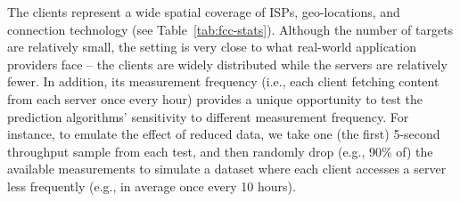 The clients
represent a wide spatial coverage of ISPs, geo-locations, and connection technology (see Table~\ref{tab:fcc-stats}). Although the number of targets are relatively small, the setting is very close to what real-world application providers face -- the clients are widely distributed while the servers are relatively fewer. 
In addition, its measurement frequency (i.e., each client fetching content from each server once every hour) provides a unique opportunity to test the prediction algorithms' sensitivity to different measurement frequency. 
For instance, to emulate the effect of reduced data, we take one (the first) 5-second throughput sample from each test, and then randomly drop (e.g., 90\% of) the available measurements to simulate a dataset where each client accesses a server less frequently (e.g., in average once every 10 hours).



